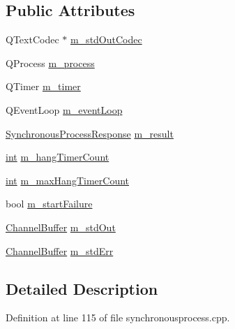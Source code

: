 \subsection*{Public Attributes}
\begin{DoxyCompactItemize}
\item 
Q\-Text\-Codec $\ast$ \hyperlink{struct_utils_1_1_synchronous_process_private_ae309539275cdf8ecf4189526058d2cb6}{m\-\_\-std\-Out\-Codec}
\item 
Q\-Process \hyperlink{struct_utils_1_1_synchronous_process_private_a9d038c134196fac6a5f996a3d290ef3a}{m\-\_\-process}
\item 
Q\-Timer \hyperlink{struct_utils_1_1_synchronous_process_private_a3fe987ce5909ead1e57e259369e56178}{m\-\_\-timer}
\item 
Q\-Event\-Loop \hyperlink{struct_utils_1_1_synchronous_process_private_a6180310bc850d467e6de05bb290cbe4d}{m\-\_\-event\-Loop}
\item 
\hyperlink{struct_utils_1_1_synchronous_process_response}{Synchronous\-Process\-Response} \hyperlink{struct_utils_1_1_synchronous_process_private_a608f84c5b1a6612ba627ddbe33fe5a0a}{m\-\_\-result}
\item 
\hyperlink{ioapi_8h_a787fa3cf048117ba7123753c1e74fcd6}{int} \hyperlink{struct_utils_1_1_synchronous_process_private_ac7de20b273159cc80d6e65fc726667a9}{m\-\_\-hang\-Timer\-Count}
\item 
\hyperlink{ioapi_8h_a787fa3cf048117ba7123753c1e74fcd6}{int} \hyperlink{struct_utils_1_1_synchronous_process_private_a597b1e5e3588256a60e31e098839f985}{m\-\_\-max\-Hang\-Timer\-Count}
\item 
bool \hyperlink{struct_utils_1_1_synchronous_process_private_af0eb23e013827b48bea15ed1ba1365c0}{m\-\_\-start\-Failure}
\item 
\hyperlink{struct_utils_1_1_channel_buffer}{Channel\-Buffer} \hyperlink{struct_utils_1_1_synchronous_process_private_a619a54cc495542f58dba37ea569d02df}{m\-\_\-std\-Out}
\item 
\hyperlink{struct_utils_1_1_channel_buffer}{Channel\-Buffer} \hyperlink{struct_utils_1_1_synchronous_process_private_a91f0119521a74e8a136b01fee2e6bc2c}{m\-\_\-std\-Err}
\end{DoxyCompactItemize}


\subsection{Detailed Description}


Definition at line 115 of file synchronousprocess.\-cpp.




